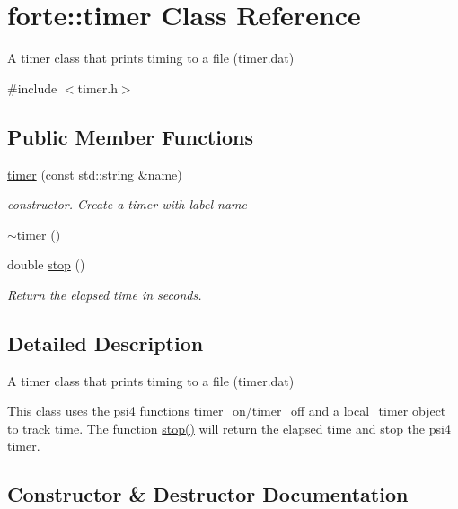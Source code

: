 \hypertarget{classforte_1_1timer}{}\section{forte\+:\+:timer Class Reference}
\label{classforte_1_1timer}


A timer class that prints timing to a file (timer.\+dat)  




{\ttfamily \#include $<$timer.\+h$>$}

\subsection*{Public Member Functions}
\begin{DoxyCompactItemize}
\item 
\mbox{\hyperlink{classforte_1_1timer_a2018bd3dca650e2d04db719e7a01781e}{timer}} (const std\+::string \&name)
\begin{DoxyCompactList}\small\item\em constructor. Create a timer with label name \end{DoxyCompactList}\item 
\mbox{\hyperlink{classforte_1_1timer_ae831d007f3b77fe638efbb2abeaf8a3c}{$\sim$timer}} ()
\item 
double \mbox{\hyperlink{classforte_1_1timer_a7e2811e5870d347a1604973d06e41554}{stop}} ()
\begin{DoxyCompactList}\small\item\em Return the elapsed time in seconds. \end{DoxyCompactList}\end{DoxyCompactItemize}


\subsection{Detailed Description}
A timer class that prints timing to a file (timer.\+dat) 

This class uses the psi4 functions timer\+\_\+on/timer\+\_\+off and a \mbox{\hyperlink{classforte_1_1local__timer}{local\+\_\+timer}} object to track time. The function \mbox{\hyperlink{classforte_1_1timer_a7e2811e5870d347a1604973d06e41554}{stop()}} will return the elapsed time and stop the psi4 timer. 

\subsection{Constructor \& Destructor Documentation}
\mbox{\label{classforte_1_1timer_a2018bd3dca650e2d04db719e7a01781e}} 
